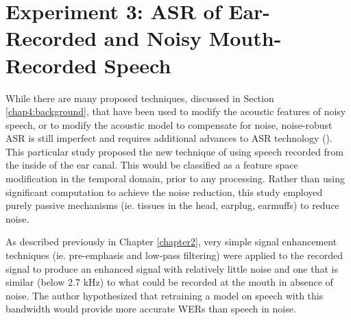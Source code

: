% 
% 
% 
% 
% 





\section{Experiment 3: ASR of Ear-Recorded and Noisy Mouth-Recorded Speech}\label{expt3}

While there are many proposed techniques, discussed in Section \ref{chap4:background}, that have been used to modify the acoustic features of noisy speech, or to modify the acoustic model to compensate for noise, noise-robust ASR is still imperfect and requires additional advances to ASR technology (\cite{zhang:17}).  This particular study proposed the new technique of using speech recorded from the inside of the ear canal.  This would be classified as a feature space modification in the temporal domain, prior to any processing.  Rather than using significant computation to achieve the noise reduction, this study employed purely passive mechanisms (ie. tissues in the head, earplug, earmuffs) to reduce noise.  

As described previously in Chapter \ref{chapter2}, very simple signal enhancement techniques (ie. pre-emphasis and low-pass filtering) were applied to the recorded signal to produce an enhanced signal with relatively little noise and one that is similar (below 2.7 kHz) to what could be recorded at the mouth in absence of noise.  The author hypothesized that retraining a model on speech with this bandwidth would provide more accurate WERs than speech in noise.

